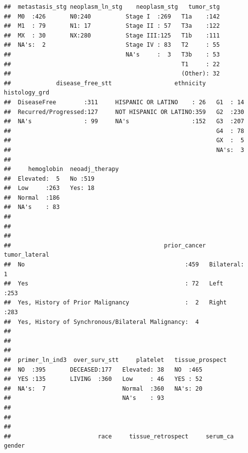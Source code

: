 \documentclass[]{article}
\begin{document}
\begin{verbatim}
##  metastasis_stg neoplasm_ln_stg    neoplasm_stg   tumor_stg  
##  M0  :426       N0:240          Stage I  :269   T1a    :142  
##  M1  : 79       N1: 17          Stage II : 57   T3a    :122  
##  MX  : 30       NX:280          Stage III:125   T1b    :111  
##  NA's:  2                       Stage IV : 83   T2     : 55  
##                                 NA's     :  3   T3b    : 53  
##                                                 T1     : 22  
##                                                 (Other): 32  
##             disease_free_stt                  ethnicity   histology_grd
##  DiseaseFree        :311     HISPANIC OR LATINO    : 26   G1  : 14     
##  Recurred/Progressed:127     NOT HISPANIC OR LATINO:359   G2  :230     
##  NA's               : 99     NA's                  :152   G3  :207     
##                                                           G4  : 78     
##                                                           GX  :  5     
##                                                           NA's:  3     
##                                                                        
##     hemoglobin  neoadj_therapy
##  Elevated:  5   No :519       
##  Low     :263   Yes: 18       
##  Normal  :186                 
##  NA's    : 83                 
##                               
##                               
##                               
##                                            prior_cancer   tumor_lateral
##  No                                              :459   Bilateral:  1  
##  Yes                                             : 72   Left     :253  
##  Yes, History of Prior Malignancy                :  2   Right    :283  
##  Yes, History of Synchronous/Bilateral Malignancy:  4                  
##                                                                        
##                                                                        
##                                                                        
##  primer_ln_ind3  over_surv_stt     platelet   tissue_prospect
##  NO  :395       DECEASED:177   Elevated: 38   NO  :465       
##  YES :135       LIVING  :360   Low     : 46   YES : 52       
##  NA's:  7                      Normal  :360   NA's: 20       
##                                NA's    : 93                  
##                                                              
##                                                              
##                                                              
##                         race     tissue_retrospect     serum_ca      gender   

\end{verbatim}
\end{document}
